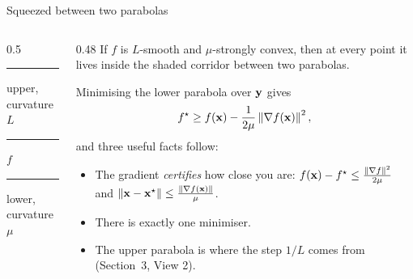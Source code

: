 \begin{frame}{Squeezed between two parabolas}
  \begin{columns}[T]
    \begin{column}{0.5\textwidth}
      \centering
      

      \scriptsize
      \textcolor{mRed}{\rule[2pt]{10pt}{1.1pt}} upper, curvature $L$ \quad
      \textcolor{mInk}{\rule[2pt]{10pt}{1.8pt}} $f$ \quad
      \textcolor{mBlue}{\rule[2pt]{10pt}{1.1pt}} lower, curvature $\mu$
    \end{column}
    \begin{column}{0.48\textwidth}
      \small
      If $f$ is $L$-smooth and $\mu$-strongly convex, then at every point it lives inside the shaded corridor
      between two parabolas.

      \vspace{3pt}
      Minimising the lower parabola over $\mathbf{y}$ gives
      \[
        f^\star \ge f(\mathbf{x}) - \frac{1}{2\mu}\left\lVert \nabla f(\mathbf{x}) \right\rVert^2 ,
      \]
      and three useful facts follow:
      \begin{itemize}\footnotesize
        \item The gradient \emph{certifies} how close you are: $f(\mathbf{x})-f^\star\le\frac{\left\lVert \nabla f \right\rVert^2}{2\mu}$ and
              $\left\lVert \mathbf{x}-\mathbf{x}^\star \right\rVert\le\frac{\left\lVert \nabla f(\mathbf{x}) \right\rVert}{\mu}$.
        \item There is exactly one minimiser.
        \item The upper parabola is where the step $1/L$ comes from (Section~3, View 2).
      \end{itemize}
    \end{column}
  \end{columns}
\end{frame}

